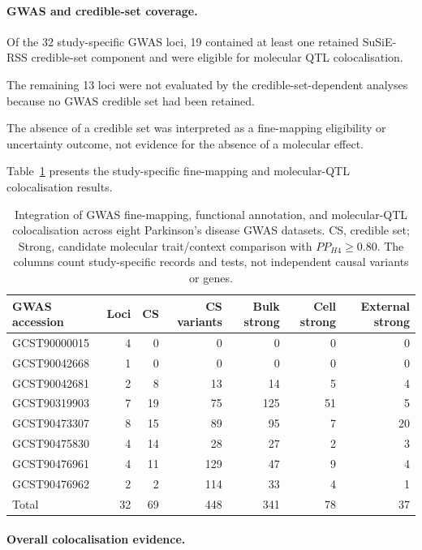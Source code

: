 \documentclass[11pt,a4paper]{article}
\begin{document}
\paragraph{GWAS and credible-set coverage.}

Of the 32 study-specific GWAS loci,
19 contained at least one retained SuSiE-RSS
credible-set component and were eligible for
molecular QTL colocalisation.

The remaining 13 loci were not evaluated by the
credible-set-dependent analyses because no
GWAS credible set had been retained.

The absence of a credible set was interpreted as
a fine-mapping eligibility or uncertainty outcome,
not evidence for the absence of a molecular effect.

Table~\ref{tab:gwas_coloc_overview} presents the
study-specific fine-mapping and molecular-QTL
colocalisation results.

\begin{table}[t]
\centering
\caption{Integration of GWAS fine-mapping, functional
annotation, and molecular-QTL colocalisation across eight
Parkinson's disease GWAS datasets.
CS, credible set; Strong, candidate molecular
trait/context comparison with $PP_{H4}\geq0.80$.
The columns count study-specific records and tests,
not independent causal variants or genes.}
\label{tab:gwas_coloc_overview}
\footnotesize
\setlength{\tabcolsep}{5pt}
\begin{tabular}{@{}lrrrrrr@{}}
\toprule
GWAS accession & Loci & CS &
CS variants & Bulk strong &
Cell strong & External strong \\
\midrule
GCST90000015 & 4 & 0 & 0 & 0 & 0 & 0 \\
GCST90042668 & 1 & 0 & 0 & 0 & 0 & 0 \\
GCST90042681 & 2 & 8 & 13 & 14 & 5 & 4 \\
GCST90319903 & 7 & 19 & 75 & 125 & 51 & 5 \\
GCST90473307 & 8 & 15 & 89 & 95 & 7 & 20 \\
GCST90475830 & 4 & 14 & 28 & 27 & 2 & 3 \\
GCST90476961 & 4 & 11 & 129 & 47 & 9 & 4 \\
GCST90476962 & 2 & 2 & 114 & 33 & 4 & 1 \\
\midrule
Total & 32 & 69 & 448 & 341 & 78 & 37 \\
\bottomrule
\end{tabular}
\end{table}


\paragraph{Overall colocalisation evidence.}
\end{document}
